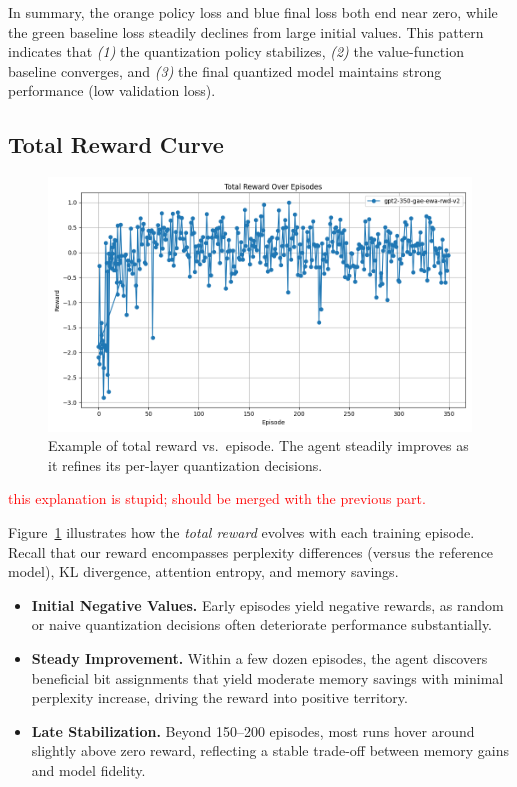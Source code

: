 \documentclass{article}
\newcommand{\red}[1]{\textcolor{red}{#1}}
\begin{document}
	In summary, the orange policy loss and blue final loss both end near zero, while the green baseline loss steadily declines from large initial values. 
	This pattern indicates that \emph{(1)} the quantization policy stabilizes, \emph{(2)} the value-function baseline converges, and \emph{(3)} the final quantized model maintains strong performance (low validation loss). 
		
	\subsection{Total Reward Curve}
	\begin{figure}[ht]
	\centering
	\includegraphics[width=\columnwidth]{gpt2-350-gae-ewa-rwd-v2-reward.png}
	\vspace{-1em}
	\caption{\small Example of total reward vs.\ episode. The agent steadily improves as it refines its per-layer quantization decisions.}
	\label{fig:reward_curves}
	\vspace{-0.2em}
	\end{figure}	
	
	\red{this explanation is stupid; should be merged with the previous part.}
	
	Figure~\ref{fig:reward_curves} illustrates how the \emph{total reward} evolves with each training episode. Recall that our reward encompasses perplexity differences (versus the reference model), KL divergence, attention entropy, and memory savings. 
	
	\begin{itemize}
		\item \textbf{Initial Negative Values.} Early episodes yield negative rewards, as random or naive quantization decisions often deteriorate performance substantially.
		\item \textbf{Steady Improvement.} Within a few dozen episodes, the agent discovers beneficial bit assignments that yield moderate memory savings with minimal perplexity increase, driving the reward into positive territory.
		\item \textbf{Late Stabilization.} Beyond 150--200 episodes, most runs hover around slightly above zero reward, reflecting a stable trade-off between memory gains and model fidelity.
	\end{itemize}
	
\end{document}
